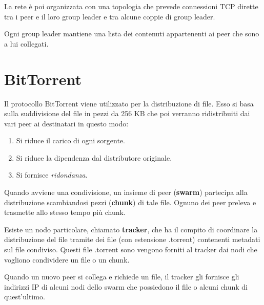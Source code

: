 La rete è poi organizzata con una topologia che prevede connessioni TCP
dirette tra i peer e il loro group leader e tra alcune coppie di group
leader.

Ogni group leader mantiene una lista dei contenuti appartenenti ai peer
che sono a lui collegati.

\section{BitTorrent}
Il protocollo BitTorrent viene utilizzato per la distribuzione di file.
Esso si basa sulla suddivisione del file in pezzi da 256 KB che poi 
verranno ridistribuiti dai vari peer ai destinatari in questo modo:
\begin{enumerate}
	\item Si riduce il carico di ogni sorgente.
	\item Si riduce la dipendenza dal distributore originale.
	\item Si fornisce \emph{ridondanza}.
\end{enumerate}
Quando avviene una condivisione, un insieme di peer (\textbf{swarm})
partecipa alla distribuzione scambiandosi pezzi (\textbf{chunk}) di 
tale file. Ognuno dei peer preleva e trasmette allo stesso tempo più
chunk.

Esiste un nodo particolare, chiamato \textbf{tracker}, che ha il
compito di coordinare la distribuzione del file tramite dei file (con
estensione .torrent) contenenti metadati sul file condiviso. Questi
file .torrent sono vengono forniti al tracker dai nodi che vogliono
condividere un file o un chunk.

Quando un nuovo peer si collega e richiede un file, il tracker gli 
fornisce gli indirizzi IP di alcuni nodi dello swarm che possiedono
il file o alcuni chunk di quest'ultimo.

